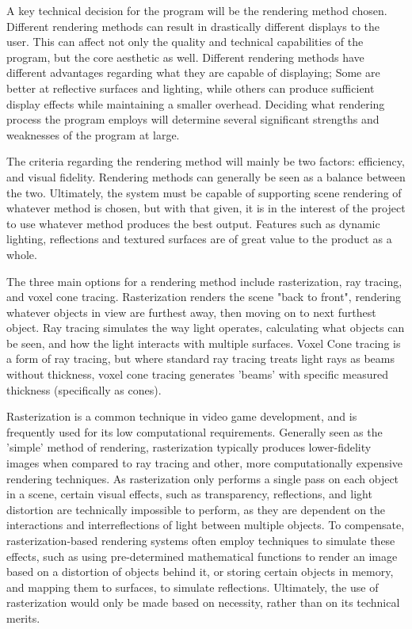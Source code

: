 \documentclass[onecolumn, draftclsnofoot,10pt, compsoc]{IEEEtran}
\newcounter{threesection}[subsubsection]
\newcounter{foursection}[threesection]
\begin{document}
A key technical decision for the program will be the rendering method chosen. Different rendering methods can result in drastically different displays to the user. This can affect not only the quality and technical capabilities of the program, but the core aesthetic as well. Different rendering methods have different advantages regarding what they are capable of displaying; Some are better at reflective surfaces and lighting, while others can produce sufficient display effects while maintaining a smaller overhead. Deciding what rendering process the program employs will determine several significant strengths and weaknesses of the program at large.

The criteria regarding the rendering method will mainly be two factors: efficiency, and visual fidelity. Rendering methods can generally be seen as a balance between the two. Ultimately, the system must be capable of supporting scene rendering of whatever method is chosen, but with that given, it is in the interest of the project to use whatever method produces the best output. Features such as dynamic lighting, reflections and textured surfaces are of great value to the product as a whole.

The three main options for a rendering method include rasterization, ray tracing, and voxel cone tracing. Rasterization renders the scene "back to front", rendering whatever objects in view are furthest away, then moving on to next furthest object. Ray tracing simulates the way light operates, calculating what objects can be seen, and how the light interacts with multiple surfaces. Voxel Cone tracing is a form of ray tracing, but where standard ray tracing treats light rays as beams without thickness, voxel cone tracing generates 'beams' with specific measured thickness (specifically as cones).

Rasterization is a common technique in video game development, and is frequently used for its low computational requirements. Generally seen as the 'simple' method of rendering, rasterization typically produces lower-fidelity images when compared to ray tracing and other, more computationally expensive rendering techniques. As rasterization only performs a single pass on each object in a scene, certain visual effects, such as transparency, reflections, and light distortion are technically impossible to perform, as they are dependent on the interactions and interreflections of light between multiple objects. To compensate, rasterization-based rendering systems often employ techniques to simulate these effects, such as using pre-determined mathematical functions to render an image based on a distortion of objects behind it, or storing certain objects in memory, and mapping them to surfaces, to simulate reflections. Ultimately, the use of rasterization would only be made based on necessity, rather than on its technical merits.
\end{document}
